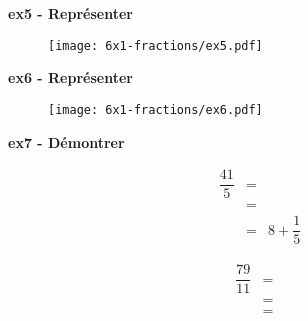 \textbf{ex5 - Représenter}

\begin{figure}[H]
  \centering
  \texttt{[image: 6x1-fractions/ex5.pdf]}
\end{figure}


\textbf{ex6 - Représenter}

\begin{figure}[H]
  \centering
  \texttt{[image: 6x1-fractions/ex6.pdf]}
\end{figure}


\textbf{ex7 - Démontrer}

\begin{multicols}{2}
  \begin{eqnarray*}
    \dfrac{41}{5} &=& \\
                  &=& \\
                  &=& 8 + \dfrac{1}{5}
  \end{eqnarray*} \columnbreak
  
  \begin{eqnarray*}
    \dfrac{79}{11} &=& \\
                  &=& \\
                  &=& 
  \end{eqnarray*}

\end{multicols}

